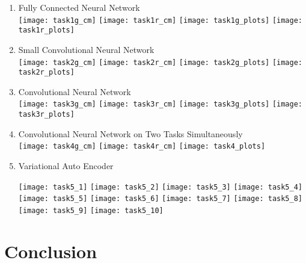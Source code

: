 \documentclass[12pt]{amsart}
\begin{document}
{	\begin{enumerate}
	\item Fully Connected Neural Network \\

	\texttt{[image: task1g\_cm]} 
	\texttt{[image: task1r\_cm]}  
	\texttt{[image: task1g\_plots]}
	\texttt{[image: task1r\_plots]}
	
	\vfill 

	\item Small Convolutional Neural Network \\

	\texttt{[image: task2g\_cm]} 
	\texttt{[image: task2r\_cm]} 
	\texttt{[image: task2g\_plots]}
	\texttt{[image: task2r\_plots]}

	\vfill 

	\item Convolutional Neural Network \\

	\texttt{[image: task3g\_cm]} 
	\texttt{[image: task3r\_cm]} 
	\texttt{[image: task3g\_plots]}
	\texttt{[image: task3r\_plots]}

	\vfill 

	\item Convolutional Neural Network on Two Tasks Simultaneously \\

	\texttt{[image: task4g\_cm]} 
	\texttt{[image: task4r\_cm]} 
	\texttt{[image: task4\_plots]}

	\vfill 

	\item Variational Auto Encoder 

	\texttt{[image: task5\_1]} 
	\texttt{[image: task5\_2]} 
	\texttt{[image: task5\_3]} 
	\texttt{[image: task5\_4]} 
	\texttt{[image: task5\_5]} 
	\texttt{[image: task5\_6]} 
	\texttt{[image: task5\_7]} 
	\texttt{[image: task5\_8]} 
	\texttt{[image: task5\_9]} 
	\texttt{[image: task5\_10]} 
	\end{enumerate}


\section{Conclusion}
\begin{itemize}


\end{itemize}}
\end{document}
